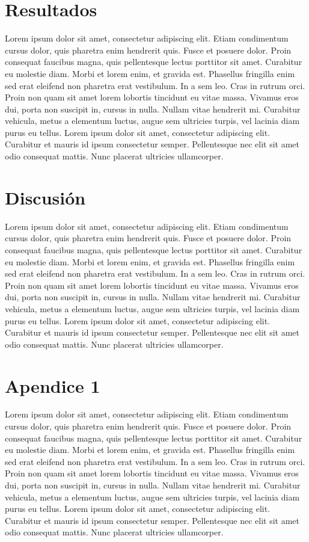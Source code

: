 \documentclass[colTwo]{NanouparIEEE}
\begin{document}
    \section{Resultados}
        Lorem ipsum dolor sit amet, consectetur adipiscing elit. Etiam condimentum cursus dolor, quis pharetra enim hendrerit quis. Fusce et posuere dolor. Proin consequat faucibus magna, quis pellentesque lectus porttitor sit amet. Curabitur eu molestie diam. Morbi et lorem enim, et gravida est. Phasellus fringilla enim sed erat eleifend non pharetra erat vestibulum. In a sem leo. Cras in rutrum orci. Proin non quam sit amet lorem lobortis tincidunt eu vitae massa. Vivamus eros dui, porta non suscipit in, cursus in nulla. Nullam vitae hendrerit mi. Curabitur vehicula, metus a elementum luctus, augue sem ultricies turpis, vel lacinia diam purus eu tellus. Lorem ipsum dolor sit amet, consectetur adipiscing elit. Curabitur et mauris id ipsum consectetur semper. Pellentesque nec elit sit amet odio consequat mattis. Nunc placerat ultricies ullamcorper.

    \section{Discusión}
        Lorem ipsum dolor sit amet, consectetur adipiscing elit. Etiam condimentum cursus dolor, quis pharetra enim hendrerit quis. Fusce et posuere dolor. Proin consequat faucibus magna, quis pellentesque lectus porttitor sit amet. Curabitur eu molestie diam. Morbi et lorem enim, et gravida est. Phasellus fringilla enim sed erat eleifend non pharetra erat vestibulum. In a sem leo. Cras in rutrum orci. Proin non quam sit amet lorem lobortis tincidunt eu vitae massa. Vivamus eros dui, porta non suscipit in, cursus in nulla. Nullam vitae hendrerit mi. Curabitur vehicula, metus a elementum luctus, augue sem ultricies turpis, vel lacinia diam purus eu tellus. Lorem ipsum dolor sit amet, consectetur adipiscing elit. Curabitur et mauris id ipsum consectetur semper. Pellentesque nec elit sit amet odio consequat mattis. Nunc placerat ultricies ullamcorper.

    \appendices
        
        \section{Apendice 1}
            Lorem ipsum dolor sit amet, consectetur adipiscing elit. Etiam condimentum cursus dolor, quis pharetra enim hendrerit quis. Fusce et posuere dolor. Proin consequat faucibus magna, quis pellentesque lectus porttitor sit amet. Curabitur eu molestie diam. Morbi et lorem enim, et gravida est. Phasellus fringilla enim sed erat eleifend non pharetra erat vestibulum. In a sem leo. Cras in rutrum orci. Proin non quam sit amet lorem lobortis tincidunt eu vitae massa. Vivamus eros dui, porta non suscipit in, cursus in nulla. Nullam vitae hendrerit mi. Curabitur vehicula, metus a elementum luctus, augue sem ultricies turpis, vel lacinia diam purus eu tellus. Lorem ipsum dolor sit amet, consectetur adipiscing elit. Curabitur et mauris id ipsum consectetur semper. Pellentesque nec elit sit amet odio consequat mattis. Nunc placerat ultricies ullamcorper.
\end{document}
